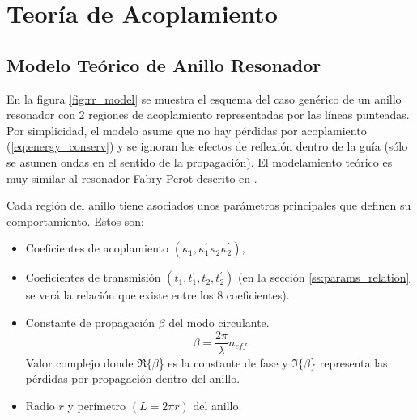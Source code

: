 \section{Teoría de Acoplamiento}
\label{sc:coupling_theory}

\subsection{Modelo Teórico de Anillo Resonador}
\label{ss:generic_theory}

En la figura \ref{fig:rr_model} se muestra el esquema del caso genérico de 
un anillo resonador con 2 regiones de acoplamiento representadas 
por las líneas punteadas. 
Por simplicidad, el modelo asume que no hay pérdidas por 
acoplamiento (\ref{eq:energy_conserv}) y se ignoran los efectos de reflexión 
dentro de la guía (sólo se asumen ondas en el sentido de la propagación). 
El modelamiento teórico es muy similar al resonador Fabry-Perot descrito en
\cite{verdeyen1989laser}.

Cada región del anillo tiene asociados unos parámetros principales que definen su 
comportamiento. Estos son:
\begin{itemize}
\item Coeficientes de acoplamiento $(\kappa_1,\kappa_1^{'}\kappa_2\kappa_2^{'})$,
\item Coeficientes de transmisión $(t_1, t_1^{'}, t_2, t_2^{'})$ (en la sección 
\ref{ss:params_relation} se verá la relación que existe entre los 8 coeficientes). 
\item Constante de propagación $\beta$ del modo circulante. 
\begin{equation}
\beta=\frac{2 \pi}{\lambda} n_{eff}
\label{eq:beta}
\end{equation} 
Valor complejo donde $\Re\{\beta$\} es la constante de fase 
y $\Im\{\beta$\} representa las pérdidas por propagación
dentro del anillo.
\item Radio $r$ y perímetro $(L=2 \pi r)$ del anillo.
\end{itemize} 


